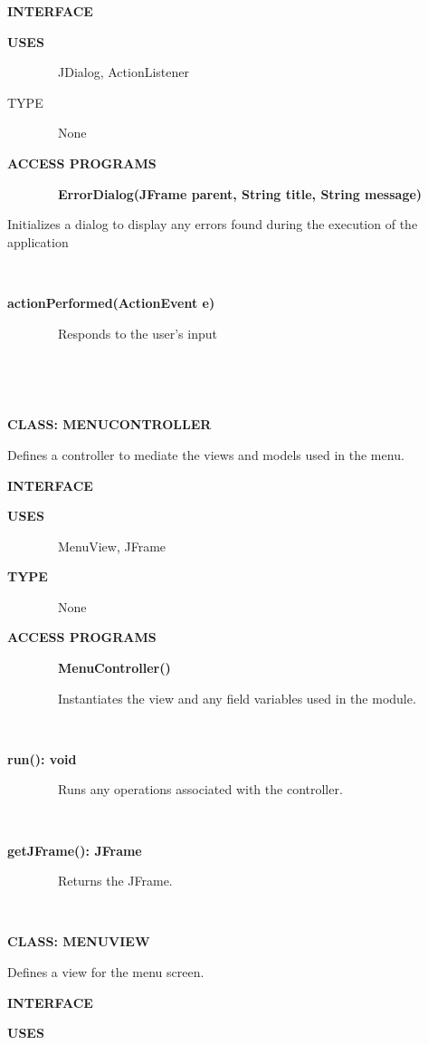 \documentclass{article}
\begin{document}
{{}

{\textbf{INTERFACE}}

{\textbf{USES}}

{~~~~~~~~JDialog, ActionListener}

{TYPE}

{~~~~~~~~None}

{\textbf{ACCESS PROGRAMS}}

{~~~~~~~~\textbf{ErrorDialog(JFrame parent, String title, String message)}}

{Initializes a dialog to display any errors found during the execution
of the application}

{~~~~~~~~~~~~~~~~}

{\textbf{actionPerformed(ActionEvent e)}}

{~~~~~~~~Responds to the user's input}

{~~~~~~~~~~~~~~~~~~~~~~~~}

{~~~~~~~~}

{\textbf{CLASS: MENUCONTROLLER}}

{Defines a controller to mediate the views and models used in the menu.}

{}

{\textbf{INTERFACE}}

{\textbf{USES}}

{~~~~~~~~MenuView, JFrame}

{\textbf{TYPE}}

{~~~~~~~~None}

{\textbf{ACCESS PROGRAMS}}

{~~~~~~~~\textbf{MenuController()}}

{~~~~~~~~Instantiates the view and any field variables used in the
module.}

{~~~~~~~~~~~~~~~~}

{\textbf{run(): void}}

{~~~~~~~~Runs any operations associated with the controller.}

{~~~~~~~~~~~~~~~~}

{\textbf{getJFrame(): JFrame}}

{~~~~~~~~Returns the JFrame.}

{~~~~~~~~~~~~~~~~}

{}

{\textbf{CLASS: MENUVIEW}}

{Defines a view for the menu screen.}

{}

{\textbf{INTERFACE}}

{\textbf{USES}}

}
\end{document}
